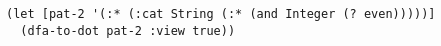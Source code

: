 \begin{lstlisting}[style=reclojureClojure]
(let [pat-2 '(:* (:cat String (:* (and Integer (? even)))))]
  (dfa-to-dot pat-2 :view true))
\end{lstlisting}
